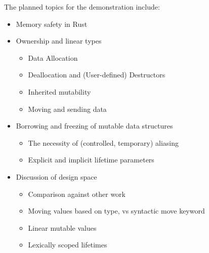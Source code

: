 \documentclass{acm_proc_article-sp}
\begin{document}
The planned topics for the demonstration include:
\begin{itemize}
\item Memory safety in Rust
\item Ownership and linear types
\begin{itemize}
\item Data Allocation
\item Deallocation and (User-defined) Destructors
\item Inherited mutability
\item Moving and sending data
\end{itemize}
\item Borrowing and freezing of mutable data structures
\begin{itemize}
\item The necessity of (controlled, temporary) aliasing
\item Explicit and implicit lifetime parameters
\end{itemize}
\item Discussion of design space
\begin{itemize}
\item Comparison against other work
\item Moving values based on type, vs syntactic move keyword
\item Linear mutable values
\item Lexically scoped lifetimes
\end{itemize}
\end{itemize}
\end{document}
